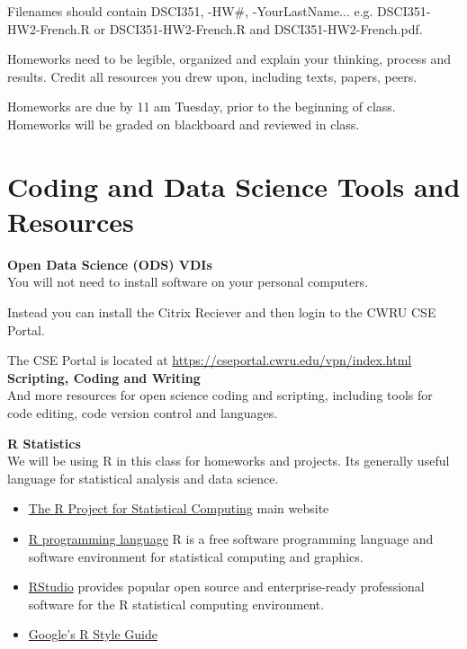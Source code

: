 \documentclass[11pt]{article} %
\begin{document}
    Filenames should contain DSCI351, -HW\#, -YourLastName... e.g. DSCI351-HW2-French.R or DSCI351-HW2-French.R and DSCI351-HW2-French.pdf. 
  
    Homeworks need to be legible, organized and explain your thinking, process and results. 
    Credit all resources you drew upon, including texts, papers, peers. 
  
    Homeworks are due by 11 am Tuesday, prior to the beginning of class. 
    Homeworks will be graded on blackboard and reviewed in class. 


\section{Coding and Data Science Tools and Resources}

  {\bf Open Data Science (ODS) VDIs} \\
  
    You will not need to install software on your personal computers. 
    
    Instead you can install the Citrix Reciever \cite{citrix_citrix_2014} and then login to the CWRU CSE Portal. \cite{cse_portal_cwru_2014} 
    
    The CSE Portal is located at \href{"https://cseportal.cwru.edu/vpn/index.html"}{https://cseportal.cwru.edu/vpn/index.html}    \\
    
    {\bf Scripting, Coding and Writing} \\
    And more resources for open science coding and scripting, including tools for code editing, code version control and languages. 
    
    {\bf R Statistics} \\
    We will be using R in this class for homeworks and projects. 
    Its generally useful language for statistical analysis and data science. 
  
      \begin{itemize}
        \item \href{"http://www.r-project.org/index.html"}{The R Project for Statistical Computing}  \cite{r_r_2014} main website
        \item \href{"http://en.wikipedia.org/wiki/R_(programming_language)"}{R programming language}  R is a free software programming language and software environment for statistical computing and graphics.\cite{r_project_r_2014} 
        \item \href{"http://www.rstudio.com/"}{ RStudio} provides popular open source and enterprise-ready professional software for the R statistical computing environment. \cite{rstudio_rstudio_2014}
        \item \href{"https://google-styleguide.googlecode.com/svn/trunk/Rguide.xml"}{ Google's R Style Guide}
      \end{itemize}
    
\end{document}
